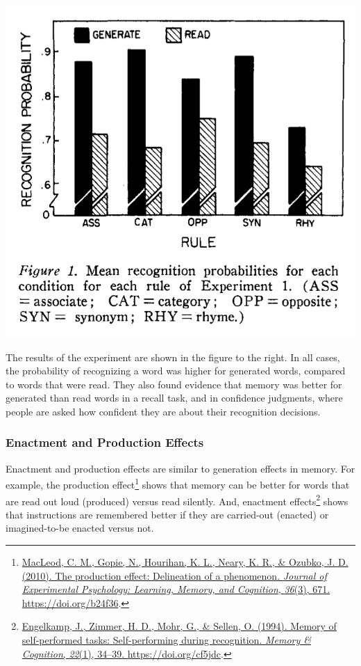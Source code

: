 \documentclass[
  oneside,
  12pt]{crumpbook}
\newenvironment{floatright50}{%
  \wrapfigure{R}{.5\textwidth}%
  }{%
  \endwrapfigure}
\begin{document}
\begin{floatright50}
\includegraphics[width=1\linewidth]{imgs/Generation_effect}

\end{floatright50}

The results of the experiment are shown in the figure to the right. In all cases, the probability of recognizing a word was higher for generated words, compared to words that were read. They also found evidence that memory was better for generated than read words in a recall task, and in confidence judgments, where people are asked how confident they are about their recognition decisions.

\hypertarget{enactment-and-production-effects}{%
\subsubsection{Enactment and Production Effects}\label{enactment-and-production-effects}}

Enactment and production effects are similar to generation effects in memory. For example, the production effect\footnote{\protect\hyperlink{ref-macleodProductionEffectDelineation2010}{MacLeod, C. M., Gopie, N., Hourihan, K. L., Neary, K. R., \& Ozubko, J. D. (2010). The production effect: Delineation of a phenomenon. \emph{Journal of Experimental Psychology: Learning, Memory, and Cognition}, \emph{36}(3), 671. \url{https://doi.org/b24f36}}.} shows that memory can be better for words that are read out loud (produced) versus read silently. And, enactment effects\footnote{\protect\hyperlink{ref-engelkampMemorySelfperformedTasks1994}{Engelkamp, J., Zimmer, H. D., Mohr, G., \& Sellen, O. (1994). Memory of self-performed tasks: {Self}-performing during recognition. \emph{Memory \& Cognition}, \emph{22}(1), 34--39. \url{https://doi.org/cf5jdc}}.} shows that instructions are remembered better if they are carried-out (enacted) or imagined-to-be enacted versus not.
\end{document}
